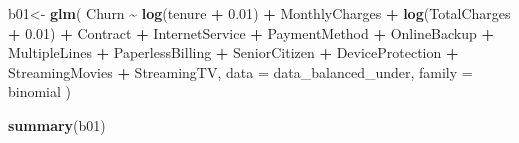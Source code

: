 \documentclass[
  twoside]{article}
\newenvironment{Shaded}{\begin{snugshade}}{\end{snugshade}}
\newcommand{\AttributeTok}[1]{\textcolor[rgb]{0.13,0.29,0.53}{#1}}
\newcommand{\FloatTok}[1]{\textcolor[rgb]{0.00,0.00,0.81}{#1}}
\newcommand{\FunctionTok}[1]{\textcolor[rgb]{0.13,0.29,0.53}{\textbf{#1}}}
\newcommand{\NormalTok}[1]{#1}
\newcommand{\OtherTok}[1]{\textcolor[rgb]{0.56,0.35,0.01}{#1}}
\newcommand{\SpecialCharTok}[1]{\textcolor[rgb]{0.81,0.36,0.00}{\textbf{#1}}}
\begin{document}
\begin{Shaded}
\begin{Highlighting}[]
\NormalTok{b01}\OtherTok{\textless{}{-}} \FunctionTok{glm}\NormalTok{(}
\NormalTok{  Churn }\SpecialCharTok{\textasciitilde{}} \FunctionTok{log}\NormalTok{(tenure }\SpecialCharTok{+} \FloatTok{0.01}\NormalTok{)}
  \SpecialCharTok{+}\NormalTok{ MonthlyCharges}
  \SpecialCharTok{+} \FunctionTok{log}\NormalTok{(TotalCharges }\SpecialCharTok{+} \FloatTok{0.01}\NormalTok{)}
  \SpecialCharTok{+}\NormalTok{ Contract  }\SpecialCharTok{+}\NormalTok{ InternetService }\SpecialCharTok{+}\NormalTok{ PaymentMethod }
  \SpecialCharTok{+}\NormalTok{ OnlineBackup }\SpecialCharTok{+}\NormalTok{ MultipleLines }\SpecialCharTok{+}\NormalTok{ PaperlessBilling }\SpecialCharTok{+}\NormalTok{ SeniorCitizen  }
  \SpecialCharTok{+}\NormalTok{ DeviceProtection }\SpecialCharTok{+}\NormalTok{ StreamingMovies }\SpecialCharTok{+}\NormalTok{ StreamingTV,}
  \AttributeTok{data =}\NormalTok{ data\_balanced\_under,}
  \AttributeTok{family =}\NormalTok{ binomial}
\NormalTok{)}

\FunctionTok{summary}\NormalTok{(b01)}
\end{Highlighting}
\end{Shaded}
\end{document}

